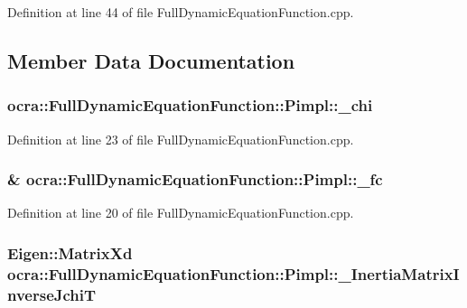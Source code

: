 Definition at line 44 of file Full\+Dynamic\+Equation\+Function.\+cpp.



\subsection{Member Data Documentation}
\subsubsection[{\texorpdfstring{\+\_\+chi}{_chi}}]{ ocra\+::\+Full\+Dynamic\+Equation\+Function\+::\+Pimpl\+::\+\_\+chi}\hypertarget{structFullDynamicEquationFunction_1_1Pimpl_a795bb07591fdf52c4b60cccfb6b3e811}{}\label{structFullDynamicEquationFunction_1_1Pimpl_a795bb07591fdf52c4b60cccfb6b3e811}


Definition at line 23 of file Full\+Dynamic\+Equation\+Function.\+cpp.

\subsubsection[{\texorpdfstring{\+\_\+fc}{_fc}}]{\& ocra\+::\+Full\+Dynamic\+Equation\+Function\+::\+Pimpl\+::\+\_\+fc}\hypertarget{structFullDynamicEquationFunction_1_1Pimpl_ab19caa3b14b35bba6a5dc5ea490cb7b4}{}\label{structFullDynamicEquationFunction_1_1Pimpl_ab19caa3b14b35bba6a5dc5ea490cb7b4}


Definition at line 20 of file Full\+Dynamic\+Equation\+Function.\+cpp.

\subsubsection[{\texorpdfstring{\+\_\+\+Inertia\+Matrix\+Inverse\+JchiT}{_InertiaMatrixInverseJchiT}}]{\setlength{\rightskip}{0pt plus 5cm}Eigen\+::\+Matrix\+Xd ocra\+::\+Full\+Dynamic\+Equation\+Function\+::\+Pimpl\+::\+\_\+\+Inertia\+Matrix\+Inverse\+JchiT}\hypertarget{structFullDynamicEquationFunction_1_1Pimpl_a66a532ac843e6bb0255918262e48a947}{}\label{structFullDynamicEquationFunction_1_1Pimpl_a66a532ac843e6bb0255918262e48a947}


